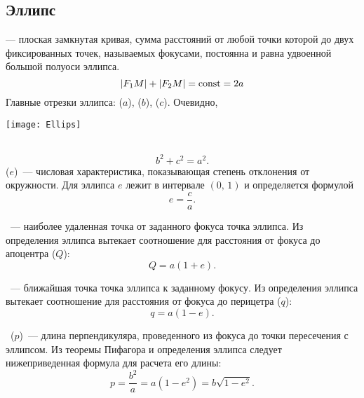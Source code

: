 \subsection{Эллипс}
\begin{minipage}{0.5\tw}
{\bfseries {}} --- плоская замкнутая кривая, сумма расстояний от любой точки которой до двух фиксированных точек, называемых фокусами, постоянна и равна удвоенной большой полуоси эллипса.
\begin{equation}
|F_1 M|+|F_2M|=\operatorname{const}=2a
\end{equation}	
Главные отрезки эллипса:  ($a$),  ($b$),  ($c$). Очевидно,
\end{minipage}
\begin{minipage}{0.5\tw}
	\begin{flushright}
		\vspace{-.5pc}
		\texttt{[image: Ellips]}
	\end{flushright}
\end{minipage}\\
\begin{equation}
	b^2 + c^2 = a^2.
\end{equation}
 ($e$)~--- числовая 
характеристика, показывающая степень отклонения от 
окружности. Для эллипса $e$ лежит в интервале $(0, \, 1)$ и
определяется формулой\begin{equation}
	e = \frac{c}{a}.
\end{equation}

~--- наиболее удаленная точка
от заданного фокуса точка эллипса. Из определения эллипса
вытекает соотношение для расстояния от фокуса до 
апоцентра ($Q$):\begin{equation}
Q = a (1 + e).
\end{equation}

~--- ближайшая точка
точка эллипса к заданному фокусу. Из определения эллипса
вытекает соотношение для расстояния от фокуса до 
перицетра ($q$):\begin{equation}
q = a (1 - e).
\end{equation}

~($p$)~--- длина перпендикуляра,
проведенного из фокуса до точки пересечения с эллипсом.
Из теоремы Пифагора и определения эллипса следует 
нижеприведенная формула для расчета его длины:
\begin{equation}
p=\frac{b^2}{a}=a(1-e^2)=b\sqrt{1-e^2}.
\end{equation}


